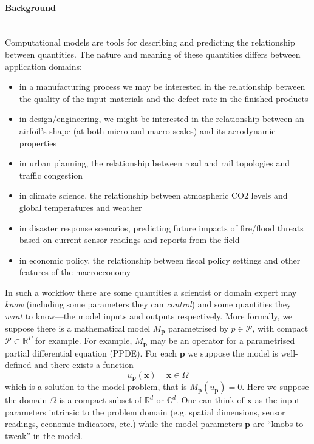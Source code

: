 \documentclass[a4paper,fontsize=12pt]{scrartcl}
\begin{document}
\paragraph*{Background}\mbox{}\\

Computational models are tools for describing and predicting the
relationship between quantities. The nature and meaning of these
quantities differs between application domains:
\begin{itemize}
\item in a manufacturing process we may be interested in the
  relationship between the quality of the input materials and the
  defect rate in the finished products
\item in design/engineering, we might be interested in the
  relationship between an airfoil's shape (at both micro and macro
  scales) and its aerodynamic properties
\item in urban planning, the relationship between road and rail
  topologies and traffic congestion
\item in climate science, the relationship between atmospheric CO2
  levels and global temperatures and weather
\item in disaster response scenarios, predicting future impacts of
  fire/flood threats based on current sensor readings and reports from
  the field
\item in economic policy, the relationship between fiscal policy
  settings and other features of the macroeconomy
\end{itemize}
In such a workflow there are some quantities a scientist or domain
expert may \emph{know} (including some parameters they can
\emph{control}) and some quantities they \emph{want} to know---the
model inputs and outputs respectively. More formally, we suppose there is a mathematical model $M_{\mathbf{p}}$ parametrised by $p\in\mathcal{P}$, with compact $\mathcal{P}\subset\mathbb{R}^{P}$ for example.
For example, $M_{\mathbf{p}}$ may be an operator for a parametrised partial differential equation (PPDE).
For each $\mathbf{p}$ we suppose the model is well-defined and there exists a function 
\begin{equation}
  \label{eq:1}
  u_{\mathbf{p}}(\mathbf{x})\, \quad \mathbf{x}\in\Omega
\end{equation}
which is a solution to the model problem, that is $M_{\mathbf{p}}(u_{\mathbf{p}})=0$.
Here we suppose the domain $\Omega$ is a compact subset of $\mathbb{R}^{d}$ or $\mathbb{C}^{d}$. 
One can think of $\mathbf{x}$ as the 
input parameters intrinsic to the problem %
domain (e.g. spatial dimensions,
sensor readings, economic indicators, etc.) while the model parameters $\mathbf{p}$
are ``knobs to tweak'' in the model.
\end{document}

